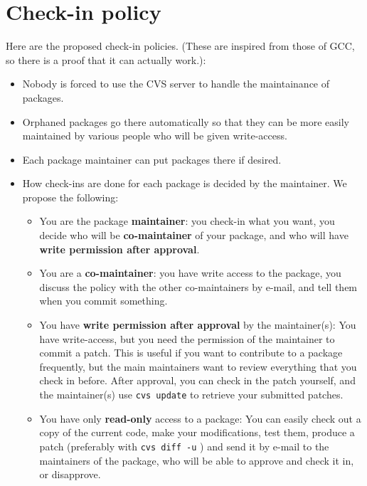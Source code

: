 \section{Check-in policy}
\label{sec:cvs_check_in}

Here are the proposed check-in policies. (These are inspired from those of GCC, 
so there is a proof that it can actually work.):

\begin{itemize}
\item Nobody is forced to use the CVS server to handle the maintainance of 
      packages.
\item Orphaned packages go there automatically so that they can be more easily
      maintained by various people who will be given write-access.
\item Each package maintainer can put packages there if desired.
\item How check-ins are done for each package is decided by the maintainer.
      We propose the following:
     \begin{itemize}
     \item You are the package {\bf maintainer}: you check-in what you want,
          you decide who will be {\bf co-maintainer} of your package, and
	  who will have {\bf write permission after approval}.
     \item You are a {\bf co-maintainer}: you have write access to the
          package, you discuss the policy with the other co-maintainers
          by e-mail, and tell them when you commit something.
     \item You have {\bf write permission after approval} by the maintainer(s):
           You have write-access, but you need the permission
	   of the maintainer to commit a patch.
          This is useful if you want to contribute to a package frequently,
          but the main maintainers want to review everything that you
          check in before.  After approval, you can check in the patch
          yourself, and the maintainer(s) use \texttt{cvs update} to retrieve
	  your submitted patches.
     \item You have only {\bf read-only} access to a package: 
           You can easily check out a copy of the current code,
	   make your modifications, test them, produce a patch (preferably
	   with \texttt{cvs diff -u} ) and send it by e-mail to the
	   maintainers of the package, who will be able to approve and check
	   it in, or disapprove.
     \end{itemize}
\end{itemize}



